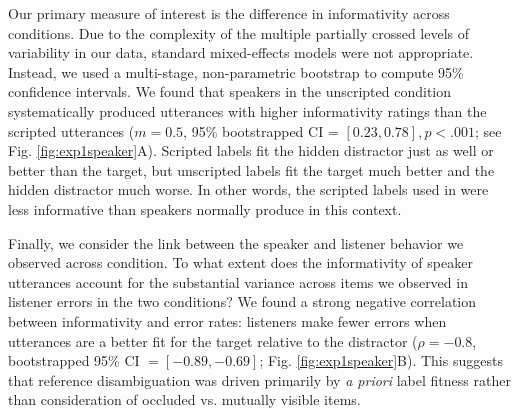 \documentclass[manuscript]{stjour}
\begin{document}
Our primary measure of interest is the difference in informativity across conditions. Due to the complexity of the multiple partially crossed levels of variability in our data, standard mixed-effects models were not appropriate. Instead, we used a multi-stage, non-parametric bootstrap to compute 95\% confidence intervals. We found that speakers in the unscripted condition systematically produced utterances with higher informativity ratings than the scripted utterances ($m = 0.5$, 95\% bootstrapped CI = $[0.23, 0.78], p < .001$; see Fig. \ref{fig:exp1speaker}A). Scripted labels fit the hidden distractor just as well or better than the target, but unscripted labels fit the target much better and the hidden distractor much worse. In other words, the scripted labels used in \cite{KeysarLinBarr03_LimitsOnTheoryOfMindUse} were less informative than speakers normally produce in this context. 

Finally, we consider the link between the speaker and listener behavior we observed across condition. To what extent does the informativity of speaker utterances account for the substantial variance across items we observed in listener errors in the two conditions? We found a strong negative correlation between informativity and error rates: listeners make fewer errors when utterances are a better fit for the target relative to the distractor ($\rho = -0.8$, bootstrapped 95\% CI $= [-0.89, -0.69]$; Fig. \ref{fig:exp1speaker}B). This suggests that reference disambiguation was driven primarily by \emph{a priori} label fitness rather than consideration of occluded vs. mutually visible items. 
\end{document}
